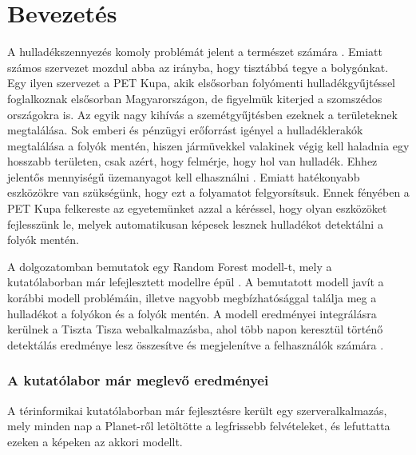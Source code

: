 \chapter{Bevezetés}
\label{ch:intro}

A hulladékszennyezés komoly problémát jelent a természet számára \cite{kibria2023PlasticWaste}. Emiatt számos szervezet mozdul abba az irányba, hogy tisztábbá tegye a bolygónkat. Egy ilyen szervezet a PET Kupa, akik elsősorban folyómenti hulladékgyűjtéssel foglalkoznak elsősorban Magyarországon, de figyelmük kiterjed a szomszédos országokra is. Az egyik nagy kihívás a szemétgyűjtésben ezeknek a területeknek megtalálása. Sok emberi és pénzügyi erőforrást igényel a hulladéklerakók megtalálása a folyók mentén, hiszen jármüvekkel valakinek végig kell haladnia egy hosszabb területen, csak azért, hogy felmérje, hogy hol van hulladék. Ehhez jelentős mennyiségű üzemanyagot kell elhasználni . Emiatt hatékonyabb eszközökre van szükségünk, hogy ezt a folyamatot felgyorsítsuk. Ennek fényében a PET Kupa felkereste az egyetemünket azzal a kéréssel, hogy olyan eszközöket fejlesszünk le, melyek automatikusan képesek lesznek hulladékot detektálni a folyók mentén.

A dolgozatomban bemutatok egy Random Forest modell-t, mely a kutatólaborban már lefejlesztett modellre épül \cite{magyar2023}. A bemutatott modell javít a korábbi modell problémáin, illetve nagyobb megbízhatósággal találja meg a hulladékot a folyókon és a folyók mentén. A modell eredményei integrálásra kerülnek a Tiszta Tisza webalkalmazásba, ahol több napon keresztül történő detektálás eredménye lesz összesítve és megjelenítve a felhasználók számára .

\subsection{A kutatólabor már meglevő eredményei}

A térinformikai kutatólaborban már fejlesztésre került egy szerveralkalmazás, mely minden nap a Planet-ről letöltötte a legfrissebb felvételeket, és lefuttatta ezeken a képeken az akkori modellt.